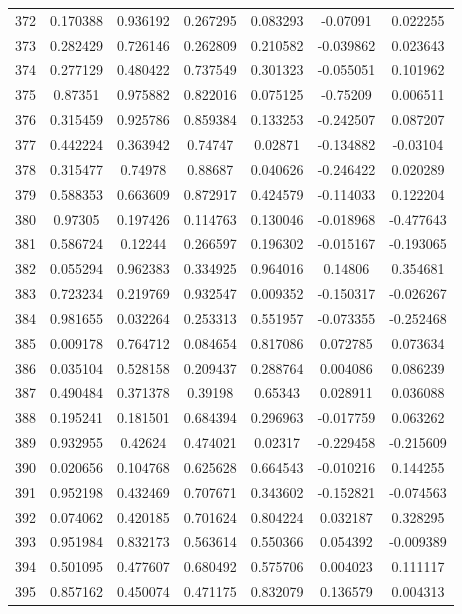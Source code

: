 \begin{table}
\begin{tabular}{c|c|c|c|c|c|c}
372 & 0.170388 & 0.936192 & 0.267295 & 0.083293 & -0.07091 & 0.022255\\
373 & 0.282429 & 0.726146 & 0.262809 & 0.210582 & -0.039862 & 0.023643\\
374 & 0.277129 & 0.480422 & 0.737549 & 0.301323 & -0.055051 & 0.101962\\
375 & 0.87351 & 0.975882 & 0.822016 & 0.075125 & -0.75209 & 0.006511\\
376 & 0.315459 & 0.925786 & 0.859384 & 0.133253 & -0.242507 & 0.087207\\
377 & 0.442224 & 0.363942 & 0.74747 & 0.02871 & -0.134882 & -0.03104\\
378 & 0.315477 & 0.74978 & 0.88687 & 0.040626 & -0.246422 & 0.020289\\
379 & 0.588353 & 0.663609 & 0.872917 & 0.424579 & -0.114033 & 0.122204\\
380 & 0.97305 & 0.197426 & 0.114763 & 0.130046 & -0.018968 & -0.477643\\
381 & 0.586724 & 0.12244 & 0.266597 & 0.196302 & -0.015167 & -0.193065\\
382 & 0.055294 & 0.962383 & 0.334925 & 0.964016 & 0.14806 & 0.354681\\
383 & 0.723234 & 0.219769 & 0.932547 & 0.009352 & -0.150317 & -0.026267\\
384 & 0.981655 & 0.032264 & 0.253313 & 0.551957 & -0.073355 & -0.252468\\
385 & 0.009178 & 0.764712 & 0.084654 & 0.817086 & 0.072785 & 0.073634\\
386 & 0.035104 & 0.528158 & 0.209437 & 0.288764 & 0.004086 & 0.086239\\
387 & 0.490484 & 0.371378 & 0.39198 & 0.65343 & 0.028911 & 0.036088\\
388 & 0.195241 & 0.181501 & 0.684394 & 0.296963 & -0.017759 & 0.063262\\
389 & 0.932955 & 0.42624 & 0.474021 & 0.02317 & -0.229458 & -0.215609\\
390 & 0.020656 & 0.104768 & 0.625628 & 0.664543 & -0.010216 & 0.144255\\
391 & 0.952198 & 0.432469 & 0.707671 & 0.343602 & -0.152821 & -0.074563\\
392 & 0.074062 & 0.420185 & 0.701624 & 0.804224 & 0.032187 & 0.328295\\
393 & 0.951984 & 0.832173 & 0.563614 & 0.550366 & 0.054392 & -0.009389\\
394 & 0.501095 & 0.477607 & 0.680492 & 0.575706 & 0.004023 & 0.111117\\
395 & 0.857162 & 0.450074 & 0.471175 & 0.832079 & 0.136579 & 0.004313\\

\end{tabular}
\end{table}
